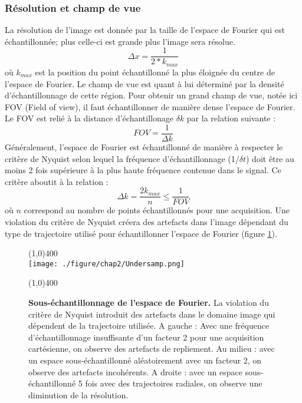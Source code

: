 \subsubsection{Résolution et champ de vue}

La résolution de l'image est donnée par la taille de l'espace de Fourier qui est échantillonnée; plus celle-ci est grande plus l'image sera résolue.
\begin{equation}
\Delta x = \frac{1}{2*k_{max}}
\end{equation}
où $k_{max}$ est la position du point échantillonné la plus éloignée du centre de l'espace de Fourier. Le champ de vue est quant à lui déterminé par la densité d'échantillonnage de cette région. Pour obtenir un grand champ de vue, notée ici FOV (Field of view), il faut échantillonner de manière dense l'espace de Fourier. Le FOV est relié à la distance d'échantillonage $\delta k$ par la relation suivante :
\begin{equation}
\label{eq:FOV}
FOV = \frac{1}{\Delta k}
\end{equation}
Généralement, l'espace de Fourier est échantillonné de manière à respecter le critère de Nyquist selon lequel la fréquence d'échantillonnage (1/$\delta t$) doit être au moins 2 fois supérieure à la plus haute fréquence contenue dans le signal. Ce critère aboutit à la relation :
\begin{equation}
\Delta k =\frac{2k_{max}}{n} \leq \frac{1}{FOV}
\end{equation}
où $n$ correspond au nombre de points échantillonnés pour une acquisition. Une violation du critère de Nyquist créera des artefacts dans l'image dépendant du type de trajectoire utilisé pour échantillonner l'espace de Fourier (figure \ref{fig:Undersamp}).
\begin{figure}[H]
\centering
\line(1,0){400} \\
\texttt{[image: ./figure/chap2/Undersamp.png]}
\caption[Sous-échantillonnage de l'espace de Fourier.]{\label{fig:Undersamp} \textbf{Sous-échantillonnage de l'espace de Fourier.} La violation du critère de Nyquist introduit des artefacts dans le domaine image qui dépendent de la trajectoire utilisée. A gauche : Avec une fréquence d'échantillonnage insuffisante d'un facteur 2 pour une acquisition cartésienne, on observe des artefacts de repliement. Au milieu : avec un espace sous-échantillonné aléatoirement avec un facteur 2, on observe des artefacts incohérents. A droite : avec un espace sous-échantillonné 5 fois avec des trajectoires radiales, on observe une diminution de la résolution.}
\line(1,0){400} \\
\end{figure}

